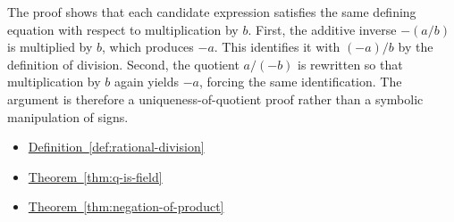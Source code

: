 \begin{remark*}
The proof shows that each candidate expression satisfies the same defining
equation with respect to multiplication by $b$.  First, the additive inverse
$-(a/b)$ is multiplied by $b$, which produces $-a$.  This identifies it with
$(-a)/b$ by the definition of division.  Second, the quotient $a/(-b)$ is
rewritten so that multiplication by $b$ again yields $-a$, forcing the same
identification.  The argument is therefore a uniqueness-of-quotient proof
rather than a symbolic manipulation of signs.
\end{remark*}

\begin{dependencies}
\begin{itemize}
  \item \hyperref[def:rational-division]{Definition~\ref*{def:rational-division}}
  \item \hyperref[thm:q-is-field]{Theorem~\ref*{thm:q-is-field}}
  \item \hyperref[thm:negation-of-product]{Theorem~\ref*{thm:negation-of-product}}
\end{itemize}
\end{dependencies}

\clearpage
